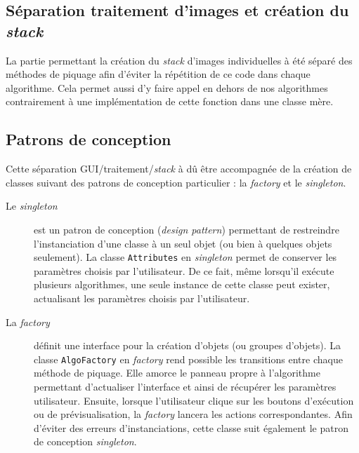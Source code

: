 \subsection{Séparation traitement d'images et création du \textit{stack}}

La partie permettant la création du \textit{stack} d'images individuelles à été séparé des méthodes de piquage afin d'éviter la répétition de ce code dans chaque algorithme. Cela permet aussi d'y faire appel en dehors de nos algorithmes contrairement à une implémentation de cette fonction dans une classe mère.

\subsection{Patrons de conception}

Cette séparation GUI/traitement/\textit{stack} à dû être accompagnée de la création de classes suivant des patrons de conception particulier : la \emph{factory} et le \emph{singleton}. 
\begin{description}
\item [Le \emph{singleton}] est un patron de conception (\textit{design pattern}) permettant de restreindre l'instanciation d'une classe à un seul objet (ou bien à quelques objets seulement). La classe \texttt{Attributes} en \emph{singleton} permet de conserver les paramètres choisis par l'utilisateur. De ce fait, même lorsqu'il exécute plusieurs algorithmes, une seule instance de cette classe peut exister, actualisant les paramètres choisis par l'utilisateur.
\item[La \emph{factory}] définit une interface pour la création d'objets (ou groupes d'objets). La classe \texttt{AlgoFactory} en \emph{factory} rend possible les transitions entre chaque méthode de piquage. Elle amorce le panneau propre à l'algorithme permettant d'actualiser l'interface et ainsi de récupérer les paramètres utilisateur. Ensuite, lorsque l'utilisateur clique sur les boutons d'exécution ou de prévisualisation, la \emph{factory} lancera les actions correspondantes. Afin d'éviter des erreurs d'instanciations, cette classe suit également le patron de conception \emph{singleton}.
\end{description}

